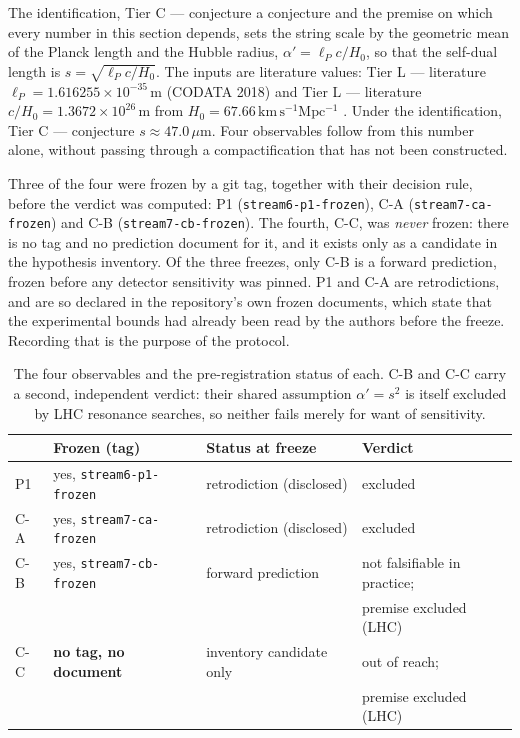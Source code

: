 \documentclass[11pt,a4paper]{article}
\theoremstyle{remark}
\newcommand{\tierL}{\colorbox{blue!10}{\textsf{\scriptsize Tier L --- literature}}}
\newcommand{\tierC}{\colorbox{orange!15}{\textsf{\scriptsize Tier C --- conjecture}}}
\begin{document}
The identification, \tierC{} a conjecture and the premise on which every number in this
section depends, sets the string scale by the geometric mean of the Planck length and the
Hubble radius, $\alpha' = \ell_P c / H_0$, so that the self-dual length is
$s = \sqrt{\ell_P c/H_0}$. The inputs are literature values: \tierL{}
$\ell_P = 1.616255\times 10^{-35}\,\mathrm{m}$ (CODATA 2018) and \tierL{}
$c/H_0 = 1.3672\times10^{26}\,\mathrm{m}$ from $H_0 = 67.66\,\mathrm{km\,s^{-1}Mpc^{-1}}$
\cite{Planck2018VI}. Under the identification, \tierC{} $s \approx 47.0\,\mu\mathrm{m}$. Four
observables follow from this number alone, without passing through a compactification that has
not been constructed.

\begin{correctionbox}
Three of the four were frozen by a git tag, together with their decision rule, before the
verdict was computed: P1 (\texttt{stream6-p1-frozen}), C-A (\texttt{stream7-ca-frozen}) and
C-B (\texttt{stream7-cb-frozen}). The fourth, C-C, was \emph{never} frozen: there is no tag and
no prediction document for it, and it exists only as a candidate in the hypothesis inventory.
Of the three freezes, only C-B is a forward prediction, frozen before any detector sensitivity
was pinned. P1 and C-A are retrodictions, and are so declared in the repository's own frozen
documents, which state that the experimental bounds had already been read by the authors before
the freeze. Recording that is the purpose of the protocol.
\end{correctionbox}

\begin{table}[htbp]
\centering
\begin{tabular}{llll}
\hline
 & Frozen (tag) & Status at freeze & Verdict \\
\hline
P1 & yes, \texttt{stream6-p1-frozen} & retrodiction (disclosed) & excluded \\
C-A & yes, \texttt{stream7-ca-frozen} & retrodiction (disclosed) & excluded \\
C-B & yes, \texttt{stream7-cb-frozen} & forward prediction & not falsifiable in practice; \\
 & & & premise excluded (LHC) \\
C-C & \textbf{no tag, no document} & inventory candidate only & out of reach; \\
 & & & premise excluded (LHC) \\
\hline
\end{tabular}
\caption{The four observables and the pre-registration status of each. C-B and C-C carry a
second, independent verdict: their shared assumption $\alpha' = s^2$ is itself excluded by LHC
resonance searches, so neither fails merely for want of sensitivity.}
\end{table}
\end{document}
